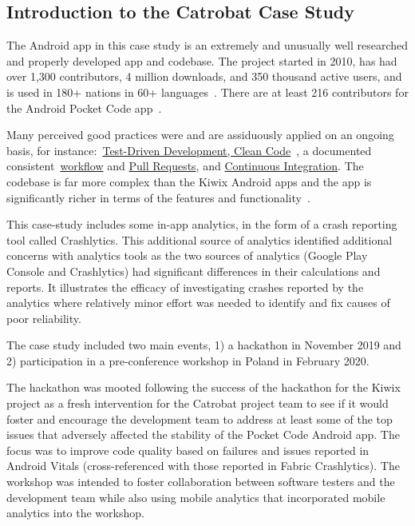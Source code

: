 \subsection{Introduction to the Catrobat Case Study}

The Android app in this case study is an extremely and unusually well researched and properly developed app and codebase. The project started in 2010, has had over 1,300 contributors, 4 million downloads, and 350 thousand active users, and is used in 180+ nations in 60+ languages~\citep{catrobat_project}. There are at least 216 contributors for the Android Pocket Code app~\citep{github_catroid}.

Many perceived good practices were and are assiduously applied on an ongoing basis, for instance:~\href{https://github.com/Catrobat/Catroid}{Test-Driven Development, Clean Code}~\citep{catrobat_first_steps_into}, a documented consistent~\href{https://github.com/Catrobat/Catroid/wiki/Workflow}{workflow} and \href{https://github.com/Catrobat/Catroid/wiki/Creating-a-pull-request}{Pull Requests}, and \href{https://jenkins.catrob.at/job/Catroid/}{Continuous Integration}. The codebase is far more complex than the Kiwix Android apps and the app is significantly richer in terms of the features and functionality~\citep{mueller2019_pocketcode}.

This case-study includes some in-app analytics, in the form of a crash reporting tool called Crashlytics. This additional source of analytics identified additional concerns with analytics tools as the two sources of analytics (Google Play Console and Crashlytics) had significant differences in their calculations and reports. It illustrates the efficacy of investigating crashes reported by the analytics where relatively minor effort was needed to identify and fix causes of poor reliability.

The case study included two main events, 1) a hackathon in November 2019 and 2) participation in a pre-conference workshop in Poland in February 2020. 

The hackathon was mooted %
following the success of the hackathon for the Kiwix project as a fresh intervention for the Catrobat project team to see if it would foster and encourage the development team to address at least some of the top issues that adversely affected the stability of the Pocket Code Android app. The focus was to improve code quality based on failures and issues reported in Android Vitals (cross-referenced with those reported in Fabric Crashlytics). The workshop was intended to foster collaboration between software testers and the development team while also using mobile analytics that incorporated mobile analytics into the workshop.


